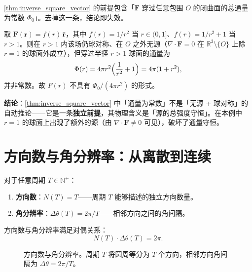 \begin{example}[反例：通量非恒定则平方反比律不成立]\label{ex:inverse_square_needs_const_flux}
\cref{thm:inverse_square_vector} 的前提包含「$\mathbf F$ 穿过任意包围 $O$ 的闭曲面的总通量为常数 $\Phi_0$」。去掉这一条，结论即失效。

取 $\mathbf F(\mathbf r) = f(r)\,\hat{\mathbf r}$，其中 $f(r) = 1/r^2$ 当 $r\in(0,1]$、$f(r)=1/r^2+1$ 当 $r>1$。则在 $r>1$ 内该场仍球对称、在 $O$ 之外无源（$\nabla\cdot\mathbf F=0$ 在 $\mathbb R^3\setminus\{O\}$ 上除 $r=1$ 的球面外成立），但穿过半径 $r>1$ 球面的通量为
\[
\Phi(r) = 4\pi r^2\Bigl(\frac{1}{r^2}+1\Bigr) = 4\pi(1+r^2),
\]
并非常数。故 $F(r)$ 不具有 $\Phi_0/(4\pi r^2)$ 的形式。

\textbf{结论}：\cref{thm:inverse_square_vector} 中「通量为常数」不是「无源 + 球对称」的自动推论——它是一条\textbf{独立前提}，其物理含义是「源的总强度守恒」。在本例中 $r=1$ 的球面上出现了额外的源（由 $\nabla\cdot\mathbf F\ne0$ 可见），破坏了通量守恒。
\end{example}

\section{方向数与角分辨率：从离散到连续}

\begin{definition}[方向数与角分辨率]\label{def:width_bandwidth}
对于任意周期 $T \in \mathbb{N}^+$：
\begin{enumerate}[label=(\roman*)]
    \item \textbf{方向数}：$N(T) = T$——周期 $T$ 能够描述的独立方向数量。
    \item \textbf{角分辨率}：$\Delta\theta(T) = 2\pi/T$——相邻方向之间的角间隔。
\end{enumerate}
方向数与角分辨率满足对偶关系：
\[
N(T) \cdot \Delta\theta(T) = 2\pi.
\]
\end{definition}

\begin{figure}[htbp]
    \centering
    \caption{方向数与角分辨率。周期 $T$ 将圆周等分为 $T$ 个方向，相邻方向角间隔为 $\Delta\theta=2\pi/T$。}
    \label{fig:direction_resolution}
\end{figure}

